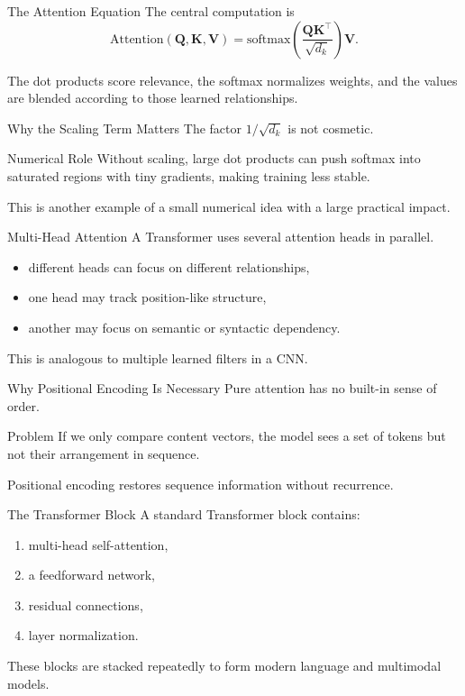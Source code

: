 \documentclass[12pt]{beamer}
\begin{document}
\begin{frame}{The Attention Equation}
  The central computation is
  \[
    \text{Attention}(\mathbf{Q},\mathbf{K},\mathbf{V})=
    \text{softmax}\!\left(\frac{\mathbf{Q}\mathbf{K}^{\top}}{\sqrt{d_k}}\right)\mathbf{V}.
  \]

  The dot products score relevance, the softmax normalizes weights, and the values are blended according to those learned relationships.
\end{frame}

\begin{frame}{Why the Scaling Term Matters}
  The factor $1/\sqrt{d_k}$ is not cosmetic.

  \begin{conceptbox}{Numerical Role}
    Without scaling, large dot products can push softmax into saturated regions with tiny gradients, making training less stable.
  \end{conceptbox}

  This is another example of a small numerical idea with a large practical impact.
\end{frame}

\begin{frame}{Multi-Head Attention}
  A Transformer uses several attention heads in parallel.

  \begin{itemize}
    \item different heads can focus on different relationships,
    \item one head may track position-like structure,
    \item another may focus on semantic or syntactic dependency.
  \end{itemize}

  This is analogous to multiple learned filters in a CNN.
\end{frame}

\begin{frame}{Why Positional Encoding Is Necessary}
  Pure attention has no built-in sense of order.

  \begin{conceptbox}{Problem}
    If we only compare content vectors, the model sees a set of tokens but not their arrangement in sequence.
  \end{conceptbox}

  Positional encoding restores sequence information without recurrence.
\end{frame}

\begin{frame}{The Transformer Block}
  A standard Transformer block contains:
  \begin{enumerate}
    \item multi-head self-attention,
    \item a feedforward network,
    \item residual connections,
    \item layer normalization.
  \end{enumerate}

  These blocks are stacked repeatedly to form modern language and multimodal models.
\end{frame}
\end{document}
